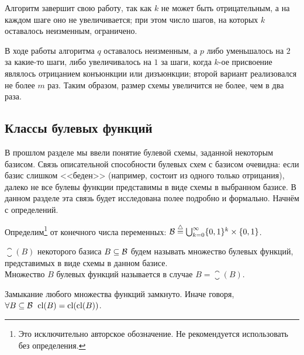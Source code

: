 \begin{Answer}
    Алгоритм завершит свою работу, так как $ k $ не может быть отрицательным,
    а на каждом шаге оно не увеличивается;
    при этом число шагов, на которых $ k $ оставалось неизменным, ограничено.

    В ходе работы алгоритма $ q $ оставалось неизменным,
    а $ p $ либо уменьшалось на $ 2 $ за какие-то шаги,
    либо увеличивалось на $ 1 $ за шаги, когда $ k $-ое присвоение являлось отрицанием конъюнкции или дизъюнкции;
    второй вариант реализовался не более $ m $ раз.
    Таким образом, размер схемы увеличится не более, чем в два раза.
\end{Answer}



\subsection{Классы булевых функций}
\label{subsec:boolean:boolean_functions_classes}

В прошлом разделе мы ввели понятие булевой схемы, заданной некоторым базисом.
Связь описательной способности булевых схем с базисом очевидна:
если базис слишком <<беден>> (например, состоит из одного только отрицания),
далеко не все булевы функции представимы в виде схемы в выбранном базисе.
В данном разделе эта связь будет исследована полее подробно и формально.
Начнём с определений.


\begin{definition}
    \label{definition:boolean:all_boolean_functions}
    Определим\footnote{Это исключительно авторское обозначение. Не рекомендуется использовать без определения.}
     от конечного числа переменных:
    $ \mathcal{B} \overset{\triangle}{=} \bigcup_{k=0}^\infty \{0, 1\}^k \times \{0, 1\} $.
\end{definition}


\begin{definition}
    \label{definition:boolean:closure}
     $ \closure (B) $ некоторого базиса $ B \subseteq \mathcal{B} $ будем называть множество булевых функций,
    представимых в виде схемы в данном базисе.
    \\[0.25\baselineskip]
    Множество $ B $ булевых функций называется  в случае $ B = \closure (B) $.
\end{definition}


\begin{statement}
    \label{statement:boolean:closure_is_closed}
    Замыкание любого множества функций замкнуто.
    Иначе говоря, $ \forall B \subseteq \mathcal{B} \;\, \operatorname*{\textnormal{cl}}(B) = \operatorname*{\textnormal{cl}}(\operatorname*{\textnormal{cl}}(B)) $.
\end{statement}


